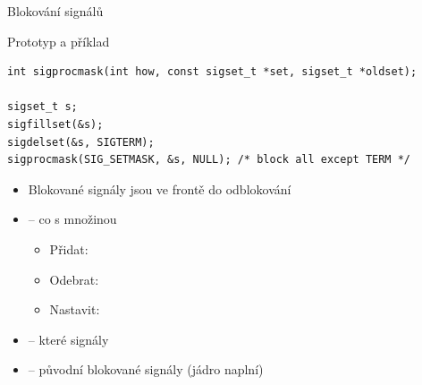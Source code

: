 \begin{frame}[fragile]{Blokování signálů}

  \begin{block}{Prototyp a příklad}
    \begin{lstlisting}[aboveskip=2pt,belowskip=2pt,columns=fullflexible]
int sigprocmask(int how, const sigset_t *set, sigset_t *oldset);

sigset_t s;
sigfillset(&s);
sigdelset(&s, SIGTERM);
sigprocmask(SIG_SETMASK, &s, NULL); /* block all except TERM */
    \end{lstlisting}
  \end{block}

  \begin{itemize}
    \item Blokované signály jsou ve frontě do odblokování

    \pause

    \item {} -- co s množinou 
    \begin{itemize}
      \item Přidat: 
      \item Odebrat: 
      \item Nastavit: 
    \end{itemize}

    \item {} -- které signály
    \item {} -- původní blokované signály (jádro naplní)
  \end{itemize}

\end{frame}

